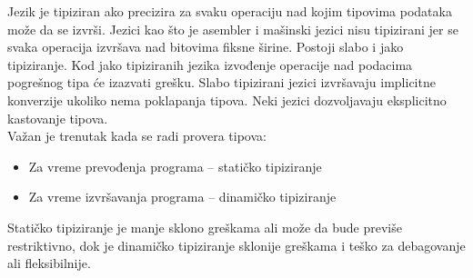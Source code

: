 \documentclass[../main.tex]{subfiles}
\begin{document}
Jezik je tipiziran ako precizira za svaku operaciju nad kojim tipovima podataka može da se izvrši. Jezici kao što je asembler i mašinski jezici nisu tipizirani jer se svaka operacija izvršava nad bitovima fiksne širine. Postoji slabo i jako tipiziranje. Kod jako tipiziranih jezika izvođenje operacije nad podacima pogrešnog tipa će izazvati grešku. Slabo tipizirani jezici izvršavaju implicitne konverzije ukoliko nema poklapanja tipova. Neki jezici dozvoljavaju eksplicitno kastovanje tipova.
\\
Važan je trenutak kada se radi provera tipova:
\begin{itemize}
\item Za vreme prevođenja programa -- statičko tipiziranje
\item Za vreme izvršavanja programa -- dinamičko tipiziranje
\end{itemize} 
Statičko tipiziranje je manje sklono greškama ali može da bude previše restriktivno, dok je dinamičko tipiziranje sklonije greškama i teško za debagovanje ali fleksibilnije.
\end{document}
